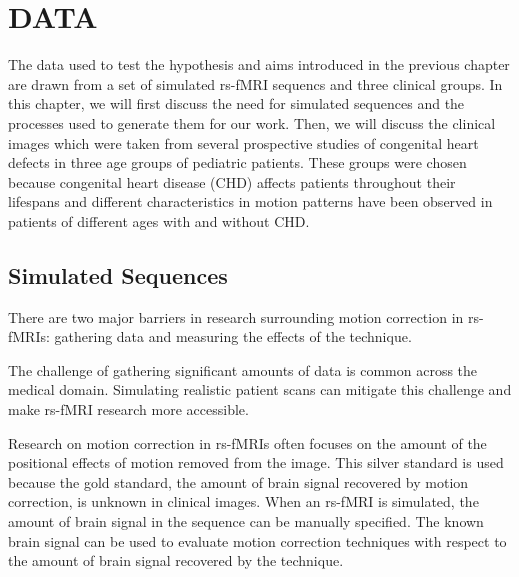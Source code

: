 \chapter{DATA}
\label{ch:data}

The data used to test the hypothesis and aims introduced in the previous chapter are drawn from a set of simulated rs-fMRI sequencs and three clinical groups. In this chapter, we will first discuss the need for simulated sequences and the processes used to generate them for our work. Then, we will discuss the clinical images which were taken from several prospective studies of congenital heart defects in three age groups of pediatric patients. These groups were chosen because congenital heart disease (CHD) affects patients throughout their lifespans and different characteristics in motion patterns have been observed in patients of different ages with and without CHD.



\section{Simulated Sequences} 

There are two major barriers in research surrounding motion correction in rs-fMRIs: gathering data and measuring the effects of the technique. 

The challenge of gathering significant amounts of data is common across the medical domain. Simulating realistic patient scans can mitigate this challenge and make rs-fMRI research more accessible. 

Research on motion correction in rs-fMRIs often focuses on the amount of the positional effects of motion removed from the image. This silver standard is used because the gold standard, the amount of brain signal recovered by motion correction, is unknown in clinical images. When an rs-fMRI is simulated, the amount of brain signal in the sequence can be manually specified. The known brain signal can be used to evaluate motion correction techniques with respect to the amount of brain signal recovered by the technique.

